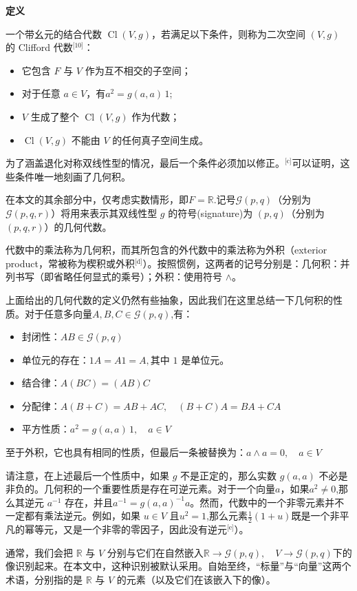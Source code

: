 \textbf{定义}

一个带幺元的结合代数 $\operatorname{Cl}(V, g)$，若满足以下条件，则称为二次空间 $(V, g)$ 的 Clifford 代数\(^\text{[10]}\)：
\begin{itemize}
\item 它包含 $F$ 与 $V$ 作为互不相交的子空间；
\item 对于任意 $a \in V$，有$a^{2} = g(a,a)\,1 $;
\item $V$ 生成了整个 $\operatorname{Cl}(V, g)$ 作为代数；
\item $\operatorname{Cl}(V, g)$ 不能由 $V$ 的任何真子空间生成。
\end{itemize}
为了涵盖退化对称双线性型的情况，最后一个条件必须加以修正。\(^\text{[c]}\)可以证明，这些条件唯一地刻画了几何积。

在本文的其余部分中，仅考虑实数情形，即$F = \mathbb{R}$.记号$\mathcal{G}(p,q)$（分别为$ \mathcal{G}(p,q,r)$）将用来表示其双线性型 $g$ 的符号(signature)为 $(p,q)$（分别为 $(p,q,r)$）的几何代数。

代数中的乘法称为几何积，而其所包含的外代数中的乘法称为外积（exterior product，常被称为楔积或外积\(^\text{[d]}\)）。按照惯例，这两者的记号分别是：几何积：并列书写（即省略任何显式的乘号）；外积：使用符号 $\wedge$。

上面给出的几何代数的定义仍然有些抽象，因此我们在这里总结一下几何积的性质。对于任意多向量$A, B, C \in \mathcal{G}(p,q)$,有：
\begin{itemize}
\item 封闭性：$AB \in \mathcal{G}(p,q)$
\item 单位元的存在：$1A = A1 = A,$其中 $1$ 是单位元。
\item 结合律：$A(BC) = (AB)C$
\item 分配律：$A(B+C) = AB + AC, \quad (B+C)A = BA + CA$
\item 平方性质：$a^2 = g(a,a)\,1, \quad a \in V$
\end{itemize}
至于外积，它也具有相同的性质，但最后一条被替换为：$a \wedge a = 0, \quad a \in V$

请注意，在上述最后一个性质中，如果 $g$ 不是正定的，那么实数 $g(a,a)$ 不必是非负的。几何积的一个重要性质是存在可逆元素。对于一个向量$a$，如果$a^{2} \neq 0$,那么其逆元 $a^{-1}$ 存在，并且$a^{-1} = g(a,a)^{-1} a$。然而，代数中的一个非零元素并不一定都有乘法逆元。例如，如果 $u \in V$ 且$u^{2} = 1$,那么元素$\frac{1}{2}(1+u)$既是一个非平凡的幂等元，又是一个非零的零因子，因此没有逆元\(^\text{[e]}\)）。

通常，我们会把 $\mathbb{R}$ 与 $V$ 分别与它们在自然嵌入$\mathbb{R} \to \mathcal{G}(p,q), \quad V \to \mathcal{G}(p,q)$下的像识别起来。在本文中，这种识别被默认采用。自始至终，“标量”与“向量”这两个术语，分别指的是 $\mathbb{R}$ 与 $V$ 的元素（以及它们在该嵌入下的像）。
